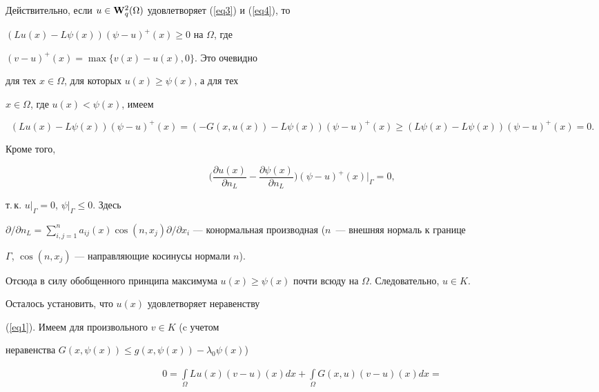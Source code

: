 \begin{pf}


Действительно, если $u\in{\bold


W}_q^2(\Omega)$ удовлетворяет (\ref{eq3}) и (\ref{eq4}), то


$(Lu(x)-L\psi(x))(\psi-u)^{+}(x)\ge 0$ на $\Omega$, где


$(v-u)^{+}(x)= \max{\{v(x)-u(x),0\}}$. Это очевидно


для тех  $x\in\Omega$, для которых $u(x)\ge \psi(x)$, а для тех


$x\in\Omega$, где $u(x)<\psi(x)$, имеем


$$


(Lu(x)-L\psi(x))(\psi-u)^{+}(x)=(-G(x,u(x))-L\psi(x))(\psi-u)^{+}(x)\ge


(L\psi(x)-L\psi(x))(\psi-u)^{+}(x)=0.


$$


Кроме того,


$$


\bigg(\frac{\partial u(x)}{\partial n_L}-


\frac{\partial\psi(x)}{\partial n_L}\bigg)(\psi-u)^{+}(x)


|_{\Gamma}=0,


$$


т.\,к. $u|_{\Gamma}=0$, $\psi |_{\Gamma}\le 0$. Здесь 


${\partial}/{\partial n_L}=


\sum\limits_{i,j=1}^na_{ij}(x)\cos(n,x_j){\partial}/{\partial


x_i}$ --- конормальная производная ($n$~--- внешняя нормаль к границе


$\Gamma$, $\cos(n,x_j)$ --- направляющие косинусы нормали $n$).





Отсюда в силу обобщенного принципа максимума \cite{Ch2}  $u(x)\ge


\psi(x)$ почти всюду на $\Omega$. Следовательно, $u\in K$.


Осталось установить, что $u(x)$ удовлетворяет неравенству


(\ref{eq1}). Имеем для произвольного $v\in K$ (c учетом


неравенства $G(x,\psi(x))\le g(x,\psi(x))- \lambda_0\psi(x)$)


\begin{gather*}


0=\int\limits_{\Omega}Lu(x)(v-u)(x)dx+


\int\limits_{\Omega}G(x,u)(v-u)(x)dx=



\end{gather*}
\end{pf}
